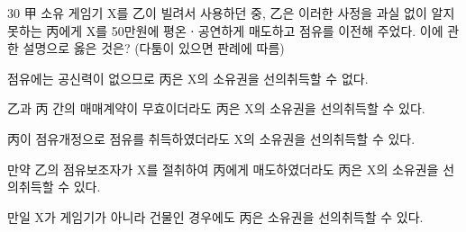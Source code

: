 \begin{question}{30}
甲 소유 게임기 X를 乙이 빌려서 사용하던 중, 乙은 이러한 사정을 과실 없이 알지 못하는 丙에게 X를 50만원에 평온ㆍ공연하게 매도하고 점유를 이전해 주었다. 이에 관한 설명으로 옳은 것은? (다툼이 있으면 판례에 따름)
\begin{choices}
  \item 점유에는 공신력이 없으므로 丙은 X의 소유권을 선의취득할 수 없다.
  \item 乙과 丙 간의 매매계약이 무효이더라도 丙은 X의 소유권을 선의취득할 수 있다.
  \item 丙이 점유개정으로 점유를 취득하였더라도 X의 소유권을 선의취득할 수 있다.
  \item 만약 乙의 점유보조자가 X를 절취하여 丙에게 매도하였더라도 丙은 X의 소유권을 선의취득할 수 있다.
  \item 만일 X가 게임기가 아니라 건물인 경우에도 丙은 소유권을 선의취득할 수 있다.
\end{choices}
\end{question}
